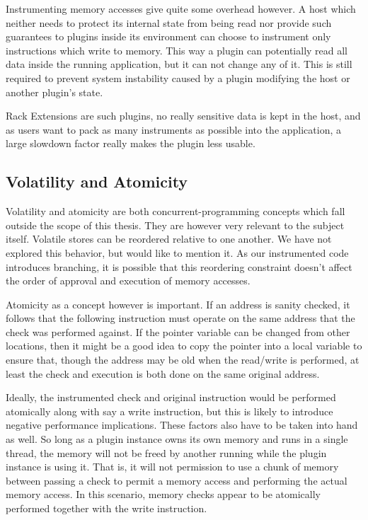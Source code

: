 Instrumenting memory accesses give quite some overhead however.
A host which neither needs to protect its internal state from being read nor
provide such guarantees to plugins inside its environment can choose to
instrument only instructions which write to memory.
This way a plugin can potentially read all data inside the running application,
but it can not change any of it.
This is still required to prevent system instability caused by a plugin
modifying the host or another plugin's state.

Rack Extensions are such plugins, no really sensitive data is kept in the host,
and as users want to pack as many instruments as possible into the application,
a large slowdown factor really makes the plugin less usable.

\subsection {Volatility and Atomicity}

Volatility and atomicity are both concurrent-programming concepts which fall
outside the scope of this thesis.
They are however very relevant to the subject itself.
Volatile stores can be reordered relative to one another.
We have not explored this behavior, but would like to mention it.
As our instrumented code introduces branching, it is possible that this
reordering constraint doesn't affect the order of approval and execution of
memory accesses.

Atomicity as a concept however is important.
If an address is sanity checked, it follows that the following instruction must
operate on the same address that the check was performed against.
If the pointer variable can be changed from other locations, then it might be a
good idea to copy the pointer into a local variable to ensure that, though the
address may be old when the read/write is performed, at least the check and
execution is both done on the same original address.

Ideally, the instrumented check and original instruction would be performed
atomically along with say a write instruction, but this is likely to introduce
negative performance implications.
These factors also have to be taken into hand as well.
So long as a plugin instance owns its own memory and runs in a single thread,
the memory will not be freed by another running while the plugin instance is
using it. That is, it will not permission to use a chunk of memory between
passing a check to permit a memory access and performing the actual memory
access.
In this scenario, memory checks appear to be atomically performed together with
the write instruction.

